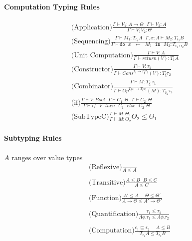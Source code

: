 \documentclass[twoside,a4paper,11pt]{article}
\newcommand{\s}{\mbox{ }}
\newcommand{\subtype}{\leq}
\newcommand{\subeffect}{\sqsubseteq}
\newcommand{\typeJudgement}[2]{\Gamma\vdash #1 \colon #2}
\newcommand{\modVarTypeJudgement}[3]{\Gamma, #1 \vdash #2 \colon #3}
\newcommand{\conditionalrule}[4]{\syntaxRule{#1}{#2}{#3} #4}
\newcommand{\syntaxRule}[3]{\displaystyle\mbox{#1}\frac{#2}{#3}}
\newcommand{\doExpr}[3]{\texttt{do} \s #1\s \leftarrow \s #2 \s \texttt{in} \s #3}
\begin{document}
\paragraph{Computation Typing Rules}

\[\begin{array}{c}
\syntaxRule{(Application)}{\typeJudgement{V_1}{A \rightarrow \Theta}\s\typeJudgement{V_2}{A}}{\typeJudgement{V_1 V_2}{\Theta}}
\\
\syntaxRule{(Sequencing)}{\typeJudgement{M_1}{T_{\epsilon_1} A}\s\modVarTypeJudgement{x: A}{M_2}{T_{\epsilon_2} B}}{\typeJudgement{\doExpr{x}{M_1}{M_2}}{T_{\epsilon_1 \circ \epsilon_2} B}}
\\
\syntaxRule{(Unit Computation)}{\typeJudgement{V}{A}}{\typeJudgement{return(V)}{T_{1}A}}
\\
\syntaxRule{(Constructor)}{\typeJudgement{V}{\tau_1}}{\typeJudgement{ Cons^{\tau_1 \rightarrow T_{\xi} \tau_2}(V)}{T_{\xi} \tau_2}}
\\
\syntaxRule{(Combinator)}{\typeJudgement{M}{{T_{\xi_1} \tau_1}}}{\typeJudgement{ Op^{T_{\xi} \tau_1 \rightarrow T_{\xi} \tau_2}(M)}{{T_{\xi_2} \tau_2}}}
\\
\syntaxRule{(if)}{\typeJudgement{V}{Bool}\s\typeJudgement{C_1}{\Theta}\s\typeJudgement{C_2}{\Theta}}{\typeJudgement{if\s V\s then\s C_1\s else \s C_2}{\Theta}}
\\
\conditionalrule{(SubTypeC)}{\typeJudgement{M}{\Theta_1}}{\typeJudgement{M}{\Theta_2}}{\Theta_2 \subtype \Theta_1}
\end{array}\]

\paragraph{Subtyping Rules}

$A$ ranges over value types
\[\begin{array}{c}

\syntaxRule{(Reflexive)}{}{A \subtype A}
\\
\\
\syntaxRule{(Transitive)}{A \subtype B\s B\subtype C}{A \subtype C}
\\
\\
\syntaxRule{(Function)}{A' \subtype A \s\s \Theta\subtype \Theta'}{A \rightarrow \Theta \subtype A' \rightarrow \Theta'}
\\
\\
\syntaxRule{(Quantification)}{\tau_1 \subtype \tau_2}{\Lambda \phi. \tau_1 \subtype \Lambda \phi. \tau_2}
\\
\\
\syntaxRule{(Computation)}{\epsilon_1 \subeffect \epsilon_2\s\s A \subtype B}{T_{\epsilon_1} A \subtype T_{\epsilon_2} B}

\end{array}\]
\end{document}
